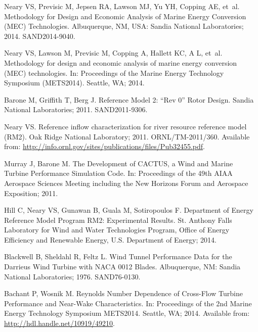 \documentclass[10pt,letterpaper]{article}
\begin{document}
\begin{thebibliography}{10}

    Neary VS, Previsic M, Jepsen RA, Lawson MJ, Yu YH, Copping AE, et~al.
    \newblock Methodology for Design and Economic Analysis of Marine Energy
      Conversion ({MEC}) Technologies.
    \newblock Albuquerque, NM, USA: Sandia National Laboratories; 2014.
      SAND2014-9040.

    Neary VS, Lawson M, Previsic M, Copping A, Hallett KC, A L, et~al.
    \newblock Methodology for design and economic analysis of marine energy
      conversion (MEC) technologies.
    \newblock In: Proceedings of the Marine Energy Technology Symposium (METS2014).
      Seattle, WA; 2014.

    Barone M, Griffith T, Berg J.
    \newblock Reference Model 2: ``Rev 0'' Rotor Design.
    \newblock Sandia National Laboratories; 2011. SAND2011-9306.

    Neary VS.
    \newblock Reference inflow characterization for river resource reference model
      (RM2).
    \newblock Oak Ridge National Laboratory; 2011. ORNL/TM-2011/360.
    \newblock Available from:
      \url{http://info.ornl.gov/sites/publications/files/Pub32455.pdf}.

    Murray J, Barone M.
    \newblock The Development of CACTUS, a Wind and Marine Turbine Performance
      Simulation Code.
    \newblock In: Proceedings of the 49th AIAA Aerospace Sciences Meeting including
      the New Horizons Forum and Aerospace Exposition; 2011.

    Hill C, Neary VS, Gunawan B, Guala M, Sotiropoulos F.
     {D}epartment of {E}nergy {R}eference {M}odel {P}rogram {RM2}:
      Experimental Results.
    \newblock St. Anthony Falls Laboratory for Wind and Water Technologies Program,
      Office of Energy Efficiency and Renewable Energy, U.S. Department of Energy;
      2014.

    Blackwell B, Sheldahl R, Feltz L.
    \newblock Wind Tunnel Performance Data for the {Darrieus} Wind Turbine with
      {NACA} 0012 Blades.
    \newblock Albuquerque, {NM}: Sandia National Laboratories; 1976. SAND76-0130.

    Bachant P, Wosnik M.
    \newblock Reynolds Number Dependence of Cross-Flow Turbine Performance and
      Near-Wake Characteristics.
    \newblock In: Proceedings of the 2nd Marine Energy Technology Symposium
      METS2014. Seattle, WA; 2014. Available from:
      \url{http://hdl.handle.net/10919/49210}.


\end{thebibliography}
\end{document}
